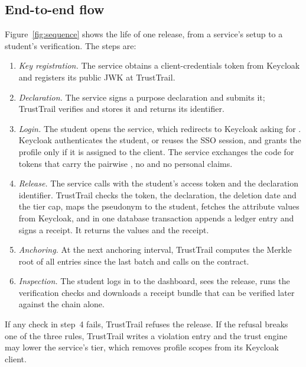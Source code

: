 \subsection{End-to-end flow}
Figure~\ref{fig:sequence} shows the life of one release, from a service's setup to a student's verification. The steps are:
\begin{enumerate}
\item \emph{Key registration.} The service obtains a client-credentials token from Keycloak and registers its public JWK at TrustTrail.
\item \emph{Declaration.} The service signs a purpose declaration and submits it; TrustTrail verifies and stores it and returns its identifier.
\item \emph{Login.} The student opens the service, which redirects to Keycloak asking for . Keycloak authenticates the student, or reuses the SSO session, and grants the profile only if it is assigned to the client. The service exchanges the code for tokens that carry the pairwise , no  and no personal claims.
\item \emph{Release.} The service calls  with the student's access token and the declaration identifier. TrustTrail checks the token, the declaration, the deletion date and the tier cap, maps the pseudonym to the student, fetches the attribute values from Keycloak, and in one database transaction appends a ledger entry and signs a receipt. It returns the values and the receipt.
\item \emph{Anchoring.} At the next anchoring interval, TrustTrail computes the Merkle root of all entries since the last batch and calls  on the contract.
\item \emph{Inspection.} The student logs in to the dashboard, sees the release, runs the verification checks and downloads a receipt bundle that can be verified later against the chain alone.
\end{enumerate}
If any check in step~4 fails, TrustTrail refuses the release. If the refusal breaks one of the three rules, TrustTrail writes a violation entry and the trust engine may lower the service's tier, which removes profile scopes from its Keycloak client.

